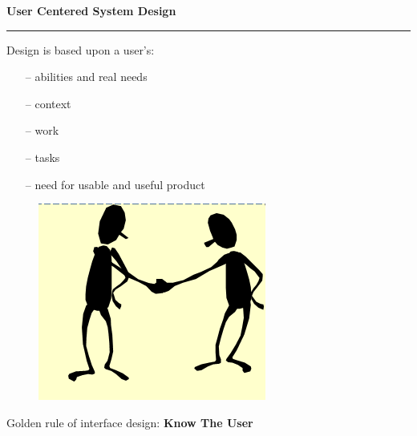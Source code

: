 \documentclass[pdf]{beamer}
\begin{document}
\begin{frame}
\vspace{8mm}
\textcolor{myBlue}{\textbf{\Large{User Centered System Design}}}

\textcolor{red}{\rule{10cm}{1mm}}

Design is based upon a user’s:

\begin{itemize}
    \item[\textcolor{black}{--}] abilities and real needs
    \item[\textcolor{black}{--}] context
    \item[\textcolor{black}{--}] work
    \item[\textcolor{black}{--}] tasks
    \item[\textcolor{black}{--}] need for usable and useful product
    \end{itemize}
    
    \begin{figure}[b]
    	\begin{flushright}
    	\includegraphics[scale = 0.45]{moro3.PNG}
        \end{flushright}
        
    \end{figure}

	Golden rule of interface design:	\LARGE     \textbf{Know The User}
\end{frame}
\end{document}
